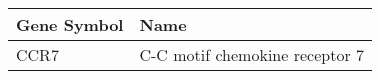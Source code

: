 \begin{tabular}{ll}
\toprule
Gene Symbol &                           Name \\
\midrule
       CCR7 & C-C motif chemokine receptor 7 \\
\bottomrule
\end{tabular}

